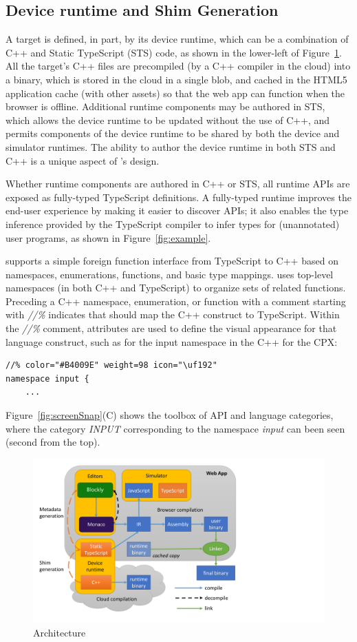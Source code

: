 \subsection{Device runtime and Shim Generation}

A \MC target is defined, in part, by its device runtime, which can be a combination of C++
and Static TypeScript (STS) code, as shown in the lower-left of Figure~\ref{fig:makecode}.
All the target's C++ files are precompiled (by a C++ compiler in the cloud)
into a binary, which is stored in the cloud in a single blob, and cached in the HTML5 application cache (with 
other assets) so that the web app can function when the browser is offline. Additional runtime
components may be authored in STS, which allows the device runtime to be updated without the
use of C++, and permits components of the device runtime to be shared by both the device
and simulator runtimes. The ability to author the device runtime in both STS and C++ is
a unique aspect of \MCN's design.

Whether runtime components are authored in C++ or STS, all runtime APIs are exposed as fully-typed
TypeScript definitions. A fully-typed runtime improves the end-user experience 
by making it easier to discover APIs; it also enables the type inference provided by the TypeScript 
compiler to infer types for (unannotated) user programs, as shown in Figure~\ref{fig:example}.

\MC supports a simple foreign function interface from TypeScript to C++ based on namespaces,
enumerations, functions, and basic type mappings. \MC uses top-level namespaces (in both C++ and
TypeScript) to organize sets of related functions.  Preceding a C++ namespace, enumeration, or function
with a comment starting with \emph{//\%} indicates that \MC should map the C++ construct to TypeScript.
Within the \emph{//\%} comment, attributes are used to define the visual appearance for that
language construct, such as for the input namespace in the C++ for the CPX:
\begin{lstlisting}
//% color="#B4009E" weight=98 icon="\uf192"
namespace input {
    ...
\end{lstlisting}

Figure~\ref{fig:screenSnap}(C) shows the toolbox of API and language categories, where the
category \emph{INPUT} corresponding to the namespace \emph{input} can been seen (second
from the top).

\begin{figure}[t]
    \includegraphics[width=4.5in]{makecodeFig.pdf}
\caption{\label{fig:makecode}\MC Architecture}
\end{figure}

